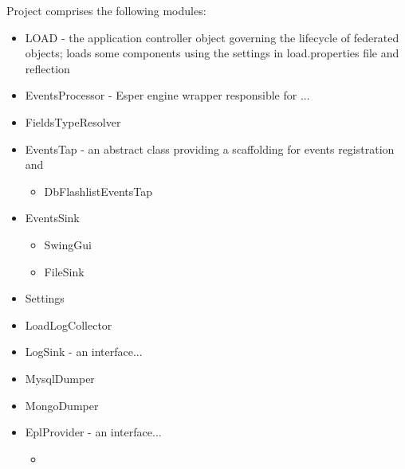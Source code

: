Project comprises the following modules:
\begin{itemize}
	\item LOAD - the application controller object governing the lifecycle of federated objects; loads some components using the settings in load.properties file and reflection
	\item EventsProcessor - Esper engine wrapper responsible for ...
	\item FieldsTypeResolver
	\item EventsTap - an abstract class providing a scaffolding for events registration and 
	\begin{itemize}
		\item DbFlashlistEventsTap
	\end{itemize}
	\item EventsSink
		\begin{itemize}
			\item{SwingGui}
			\item{FileSink}
		\end{itemize}
	\item Settings 
	\item LoadLogCollector
	\item LogSink - an interface...
	\item MysqlDumper
	\item MongoDumper
	\item EplProvider - an interface...
	\begin{itemize}
		\item
	\end{itemize}

\end{itemize}



